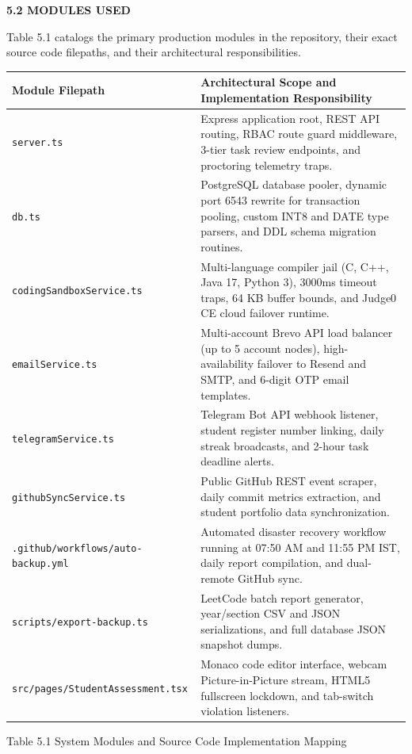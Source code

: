 \newpage

{\fontsize{14pt}{18pt}\selectfont\bfseries 5.2 MODULES USED\par}
\vspace{0.3cm}

Table 5.1 catalogs the primary production modules in the repository, their exact source code filepaths, and their architectural responsibilities.

\begin{table}[H]
  \centering
  \fontsize{10.5pt}{14.5pt}\selectfont
  \begin{tabularx}{\textwidth}{|p{4.2cm}|L|}
    \hline
    \textbf{Module Filepath} & \textbf{Architectural Scope and Implementation Responsibility} \\
    \hline
    \texttt{server.ts} & Express application root, REST API routing, RBAC route guard middleware, 3-tier task review endpoints, and proctoring telemetry traps. \\
    \hline
    \texttt{db.ts} & PostgreSQL database pooler, dynamic port 6543 rewrite for transaction pooling, custom INT8 and DATE type parsers, and DDL schema migration routines. \\
    \hline
    \texttt{codingSandboxService.ts} & Multi-language compiler jail (C, C++, Java 17, Python 3), 3000ms timeout traps, 64 KB buffer bounds, and Judge0 CE cloud failover runtime. \\
    \hline
    \texttt{emailService.ts} & Multi-account Brevo API load balancer (up to 5 account nodes), high-availability failover to Resend and SMTP, and 6-digit OTP email templates. \\
    \hline
    \texttt{telegramService.ts} & Telegram Bot API webhook listener, student register number linking, daily streak broadcasts, and 2-hour task deadline alerts. \\
    \hline
    \texttt{githubSyncService.ts} & Public GitHub REST event scraper, daily commit metrics extraction, and student portfolio data synchronization. \\
    \hline
    \texttt{.github/workflows/}\allowbreak\texttt{auto-backup.yml} & Automated disaster recovery workflow running at 07:50 AM and 11:55 PM IST, daily report compilation, and dual-remote GitHub sync. \\
    \hline
    \texttt{scripts/export-backup.ts} & LeetCode batch report generator, year/section CSV and JSON serializations, and full database JSON snapshot dumps. \\
    \hline
    \texttt{src/pages/}\allowbreak\texttt{StudentAssessment.tsx} & Monaco code editor interface, webcam Picture-in-Picture stream, HTML5 fullscreen lockdown, and tab-switch violation listeners. \\
    \hline
  \end{tabularx}
  \vspace{4pt}
  {\centering\fontsize{10.5pt}{14pt}\selectfont Table 5.1 System Modules and Source Code Implementation Mapping\par}
\end{table}

